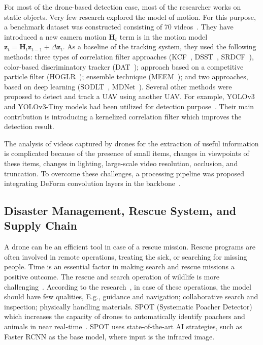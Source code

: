 For most of the drone-based detection case, most of the researcher works on static objects. Very few research explored the model of motion. For this purpose, a benchmark dataset was constructed consisting of 70 videos~\cite{li2017visual}. They have introduced a new camera motion $\mathbf{H}_{t}$ term is in the motion model $\mathbf{z}_{t}=\mathbf{H}_{t} \mathbf{z}_{t-1}+\Delta \mathbf{z}_{t}$. As a baseline of the tracking system, they used the following methods: three types of correlation filter approaches (KCF~\cite{henriques2014high}, DSST~\cite{danelljan2014accurate}, SRDCF~\cite{danelljan2015learning}), color-based discriminatory tracker (DAT~\cite{possegger2015defense}); approach based on a competitive particle filter (HOGLR~\cite{wang2015understanding}); ensemble technique (MEEM~\cite{zhang2014meem}); and two approaches, based on deep learning (SODLT~\cite{wang2015transferring}, MDNet~\cite{nam2016learning}). Several other methods were proposed to detect and track a UAV using another UAV. For example, YOLOv3 and YOLOv3-Tiny models had been utilized for detection purpose~\cite{saribas2019hybrid}. Their main contribution is introducing a kernelized  correlation filter which improves the detection result. 

The analysis of videos captured by drones for the extraction of useful information is complicated because of the presence of small items, changes in viewpoints of these items, changes in lighting, large-scale video resolution, occlusion, and truncation. To overcome these challenges, a processing pipeline  was proposed integrating DeForm convolution layers in the backbone~\cite{zhang2019dense}.

\subsection{Disaster Management, Rescue System, and Supply Chain}
A drone can be an efficient tool in case of a rescue mission. Rescue programs are often involved in remote operations, treating the sick, or searching for missing people. Time is an essential factor in making search and rescue missions a positive outcome.  The rescue and search operation of wildlife is more challenging~\cite{mayer2019drones}. According to the research~\cite{brennan2019drones}, in case of these operations, the model should have few qualities, E.g., guidance and navigation; collaborative search and inspection; physically handling materials.
SPOT (Systematic Poacher Detector) which increases the capacity of drones to automatically identify poachers and animals in near real-time~\cite{bondi2018spot}.  SPOT uses state-of-the-art AI strategies, such as Faster RCNN as the base model, where input is the infrared image.

